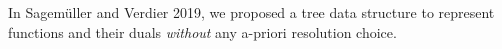 \documentclass[a4paper]{easychair}
\begin{document}
In Sagemüller and Verdier 2019\cite{SagVerdier-LazyWavelet}, we proposed a tree data structure to represent functions and their duals \emph{without} any a-priori resolution choice.



%
%

%
%
%



\end{document}
